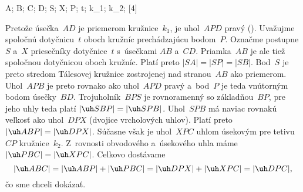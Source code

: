 {%
\fontplace
\tpoint A; \tpoint B; \bpoint C; \bpoint D;
\rtpoint S; \rbpoint X; \lBpoint P;
\lpoint t; \rBpoint k_1; \bpoint k_2;
[4] \hfil\Obr

Pretože úsečka~$AD$ je priemerom kružnice~$k_1$, je uhol~$APD$ pravý (\obr).
\inspicture{}
Uvažujme spoločnú dotyčnicu~$t$ oboch kružníc prechádzajúcu bodom~$P$.
Označme postupne $S$ a~$X$ priesečníky dotyčnice~$t$ s~úsečkami $AB$ 
a~$CD$. Priamka~$AB$ je ale tiež spoločnou dotyčnicou oboch kružníc.
Platí preto $|SA|=|SP|=|SB|$. Bod~$S$ je preto stredom Tálesovej
kružnice zostrojenej nad stranou~$AB$ ako priemerom. Uhol~$APB$ je
preto rovnako ako uhol~$APD$ pravý a~bod~$P$ je teda vnútorným
bodom úsečky~$BD$.
Trojuholník~$BPS$ je rovnoramenný so základňou~$BP$, pre jeho
uhly teda platí $|\uh SBP|=|\uh SPB|$. Uhol~$SPB$ má naviac
rovnakú veľkosť ako uhol~$DPX$ (dvojice vrcholových uhlov).
Platí preto $|\uh ABP|=|\uh DPX|$. Súčasne však je uhol~$XPC$
uhlom úsekovým pre tetivu~$CP$ kružnice~$k_2$. Z~rovnosti
obvodového a~úsekového uhla máme $|\uh PBC|=|\uh XPC|$.
Celkovo dostávame
$$
|\uh ABC|=|\uh ABP|+|\uh PBC|=|\uh DPX|+|\uh
XPC|=|\uh DPC|,
$$
čo sme chceli dokázať.}

